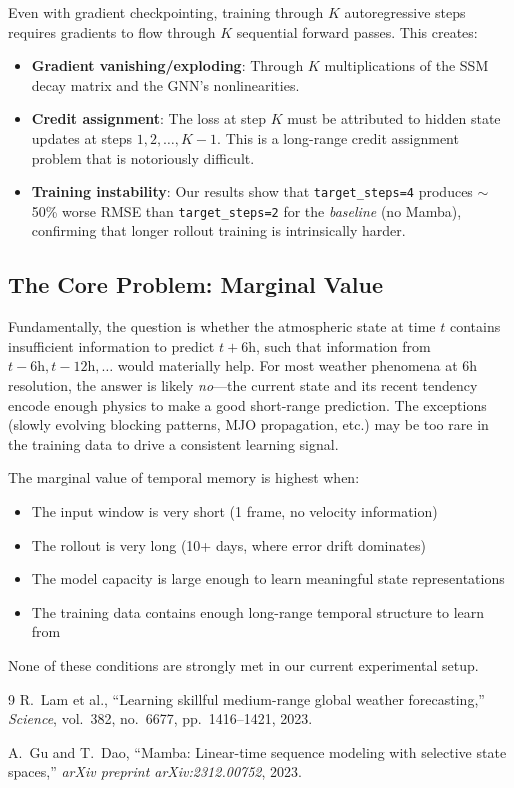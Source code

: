 \documentclass[11pt,a4paper]{article}
\begin{document}
Even with gradient checkpointing, training through $K$ autoregressive steps requires gradients to flow through $K$ sequential forward passes. This creates:
\begin{itemize}[nosep]
    \item \textbf{Gradient vanishing/exploding}: Through $K$ multiplications of the SSM decay matrix and the GNN's nonlinearities.
    \item \textbf{Credit assignment}: The loss at step $K$ must be attributed to hidden state updates at steps $1, 2, \ldots, K{-}1$. This is a long-range credit assignment problem that is notoriously difficult.
    \item \textbf{Training instability}: Our results show that \texttt{target\_steps=4} produces $\sim$50\% worse RMSE than \texttt{target\_steps=2} for the \emph{baseline} (no Mamba), confirming that longer rollout training is intrinsically harder.
\end{itemize}

\subsection{The Core Problem: Marginal Value}

Fundamentally, the question is whether the atmospheric state at time $t$ contains insufficient information to predict $t{+}6\text{h}$, such that information from $t{-}6\text{h}, t{-}12\text{h}, \ldots$ would materially help. For most weather phenomena at 6h resolution, the answer is likely \emph{no}---the current state and its recent tendency encode enough physics to make a good short-range prediction. The exceptions (slowly evolving blocking patterns, MJO propagation, etc.) may be too rare in the training data to drive a consistent learning signal.

The marginal value of temporal memory is highest when:
\begin{itemize}[nosep]
    \item The input window is very short (1 frame, no velocity information)
    \item The rollout is very long (10+ days, where error drift dominates)
    \item The model capacity is large enough to learn meaningful state representations
    \item The training data contains enough long-range temporal structure to learn from
\end{itemize}

None of these conditions are strongly met in our current experimental setup.

\begin{thebibliography}{9}
R.~Lam et al., ``Learning skillful medium-range global weather forecasting,'' \textit{Science}, vol.~382, no.~6677, pp.~1416--1421, 2023.

A.~Gu and T.~Dao, ``Mamba: Linear-time sequence modeling with selective state spaces,'' \textit{arXiv preprint arXiv:2312.00752}, 2023.
\end{thebibliography}
\end{document}
